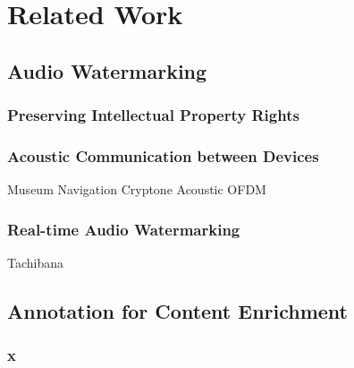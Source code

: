 \chapter{Related Work}

\section{Audio Watermarking}

\subsection{Preserving Intellectual Property Rights}


\subsection{Acoustic Communication between Devices}
Museum Navigation
Cryptone
Acoustic OFDM

\subsection{Real-time Audio Watermarking}

Tachibana

\section{Annotation for Content Enrichment}



\subsection{x}
